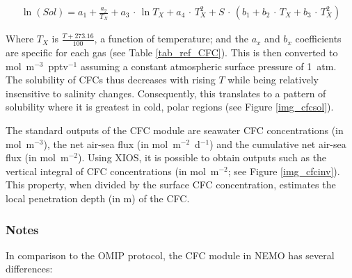\documentclass[../main/TOP_manual]{subfiles}
\begin{document}
\begin{eqnarray}
\ln{(Sol)} = a_1 + \frac{a_2}{ T_{X}} + a_3 \, \cdot \, \ln{ T_{X} } + a_4 \, \cdot \, T_{X}^2 + S \, \cdot \, ( b_1 + b_2 \, \cdot \, T_{X} + b_3 \, \cdot \, T_{X}^2 )
\label{equ_Sol_CFC}
\end{eqnarray}


Where $T_{X}$ is $\frac{T + 273.16}{100}$, a function of temperature;
and the $a_{x}$ and $b_{x}$ coefficients are specific for each gas (see Table \ref{tab_ref_CFC}).
This is then converted to mol~m$^{-3}$~pptv$^{-1}$ assuming a constant atmospheric surface pressure of 1~atm.
The solubility of CFCs thus decreases with rising $T$ while being relatively insensitive to salinity changes.
Consequently, this translates to a pattern of solubility where it is greatest in cold, polar regions (see Figure \ref{img_cfcsol}).


The standard outputs of the CFC module are seawater CFC concentrations (in mol~m$^{-3}$), the net air-sea flux (in mol~m$^{-2}$~d$^{-1}$) and the cumulative net air-sea flux (in mol~m$^{-2}$).
Using XIOS, it is possible to obtain outputs such as the vertical integral of CFC concentrations (in mol~m$^{-2}$; see Figure \ref{img_cfcinv}).
This property, when divided by the surface CFC concentration, estimates the local penetration depth (in m) of the CFC.


\subsubsection{Notes}

In comparison to the OMIP protocol, the CFC module in NEMO has several differences:
\end{document}
